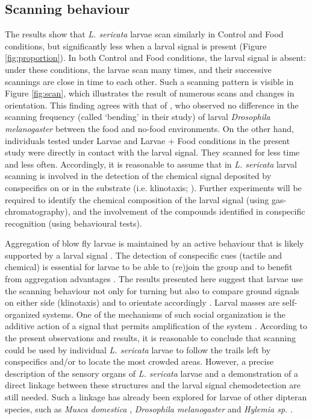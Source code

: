 			\subsection{Scanning behaviour}
The results show that \textit{L. sericata} larvae scan similarly in Control and Food conditions, but significantly less when a larval signal is present (Figure \ref{fig:proportion}). In both Control and Food conditions, the larval signal is absent: under these conditions, the larvae scan many times, and their successive scannings are close in time to each other. Such a scanning pattern is visible in Figure \ref{fig:scan}, which illustrates the result of numerous scans and changes in orientation. This finding agrees with that of \citet{green_organization_1983}, who observed no difference in the scanning frequency (called ‘bending’ in their study) of larval \textit{Drosophila melanogaster} between the food and no-food environments. On the other hand, individuals tested under Larvae and Larvae + Food conditions in the present study were directly in contact with the larval signal. They scanned for less time and less often. Accordingly, it is reasonable to assume that in \textit{L. sericata} larval scanning is involved in the detection of the chemical signal deposited by conspecifics on or in the substrate (i.e. klinotaxis; \citep{fraenkel_orientation_1961, gomez-marin_active_2012}). Further experiments will be required to identify the chemical composition of the larval signal (using gas-chromatography), and the involvement of the compounds identified in conspecific recognition (using behavioural tests). 

Aggregation of blow fly larvae is maintained by an active behaviour that is likely supported by a larval signal \cite{boulay_evidence_2013}. The detection of conspecific cues (tactile and chemical) is essential for larvae to be able to (re)join the group and to benefit from aggregation advantages \cite{rivers_physiological_2011}. The results presented here suggest that larvae use the scanning behaviour not only for turning but also to compare ground signals on either side (klinotaxis) and to orientate accordingly \cite{fraenkel_orientation_1961}. Larval masses are self-organized systems. One of the mechanisms of such social organization is the additive action of a signal that permits amplification of the system \cite{camazine_self-organization_2001}. According to the present observations and results, it is reasonable to conclude that scanning could be used by individual \textit{L. sericata} larvae to follow the trails left by conspecifics and/or to locate the most crowded areas. However, a precise description of the sensory organs of \textit{L. sericata} larvae and a demonstration of a direct linkage between these structures and the larval signal chemodetection are still needed. Such a linkage has already been explored for larvae of other dipteran species, such as \textit{Musca domestica} \citep{chu-wang_fine_1971, chu-wang_fine_1972}, \textit{Drosophila melanogaster} \cite{oppliger_neurophysiological_2000} and \textit{Hylemia sp.} \cite{honda_ultrastructures_1987}. 

